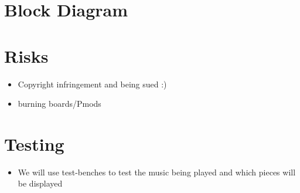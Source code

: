 \section{Block Diagram}
\section{Risks}
    \begin{itemize}
        \item Copyright infringement and being sued :)
        \item burning boards/Pmods
    \end{itemize}
\section{Testing}
    \begin{itemize}
        \item We will use test-benches to test the music being played and which pieces will be displayed
    \end{itemize}
